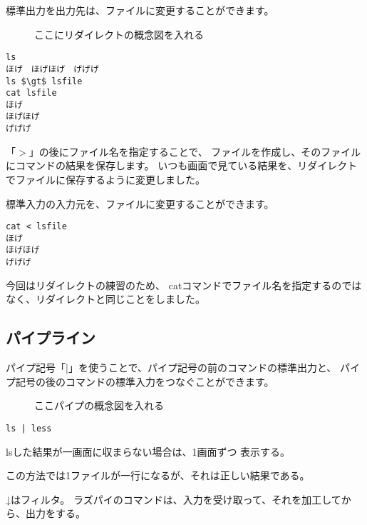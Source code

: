 標準出力を出力先は、ファイルに変更することができます。

\begin{figure}
    \vspace{5cm}
    \caption{ここにリダイレクトの概念図を入れる}
    \label{ch03:redirect}
\end{figure}


\begin{lstlisting}[caption=lsの出力をリダイレクトする, label=redirectLs]
ls 
ほげ　ほげほげ　げげげ
ls $\gt$ lsfile
cat lsfile
ほげ
ほげほげ
げげげ
\end{lstlisting}

「$\gt$」の後にファイル名を指定することで、
ファイルを作成し、そのファイルにコマンドの結果を保存します。
いつも画面で見ている結果を、リダイレクトでファイルに保存するように変更しました。


標準入力の入力元を、ファイルに変更することができます。
\begin{lstlisting}[caption=catコマンドにリダイレクトでファイルを入力する, label=redirectCat]
cat < lsfile
ほげ
ほげほげ
げげげ
\end{lstlisting}

今回はリダイレクトの練習のため、
catコマンドでファイル名を指定するのではなく、リダイレクトと同じことをしました。

\subsection{パイプライン}

パイプ記号「|」を使うことで、パイプ記号の前のコマンドの標準出力と、
パイプ記号の後のコマンドの標準入力をつなぐことができます。

\begin{figure}
    \vspace{5cm}
    \caption{ここパイプの概念図を入れる}
    \label{ch03:redirect}
\end{figure}


\begin{lstlisting}[caption=catコマンドにリダイレクトでファイルを入力する, label=redirectCat]
ls | less
\end{lstlisting}

lsした結果が一画面に収まらない場合は、1画面ずつ 表示する。

この方法では1ファイルが一行になるが、それは正しい結果である。


↓はフィルタ。
ラズパイのコマンドは、入力を受け取って、それを加工してから、出力をする。


